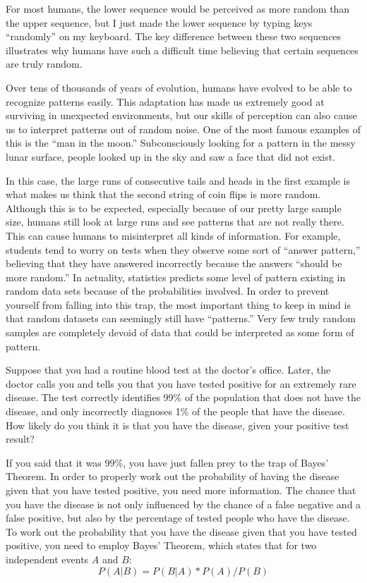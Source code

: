 For most humans, the lower sequence would be perceived as more random than the upper sequence, but I just made the lower sequence by typing keys “randomly” on my keyboard. The key difference between these two sequences illustrates why humans have such a difficult time believing that certain sequences are truly random.

Over tens of thousands of years of evolution, humans have evolved to be able to recognize patterns easily. This adaptation has made us extremely good at surviving in unexpected environments, but our skills of perception can also cause us to interpret patterns out of random noise. One of the most famous examples of this is the “man in the moon.” Subconsciously looking for a pattern in the messy lunar surface, people looked up in the sky and saw a face that did not exist. 

In this case, the large runs of consecutive tails and heads in the first example is what makes us think that the second string of coin flips is more random. Although this is to be expected, especially because of our pretty large sample size, humans still look at large runs and see patterns that are not really there. This can cause humans to misinterpret all kinds of information. For example, students tend to worry on tests when they observe some sort of “answer pattern,” believing that they have answered incorrectly because the answers “should be more random.” In actuality, statistics predicts some level of pattern existing in random data sets because of the probabilities involved. In order to prevent yourself from falling into this trap, the most important thing to keep in mind is that random datasets can seemingly still have “patterns.” Very few truly random samples are completely devoid of data that could be interpreted as some form of pattern.

Suppose that you had a routine blood test at the doctor’s office. Later, the doctor calls you and tells you that you have tested positive for an extremely rare disease. The test correctly identifies 99\% of the population that does not have the disease, and only incorrectly diagnoses 1\% of the people that have the disease. How likely do you think it is that you have the disease, given your positive test result?

If you said that it was 99\%, you have just fallen prey to the trap of Bayes’ Theorem. In order to properly work out the probability of having the disease given that you have tested positive, you need more information. The chance that you have the disease is not only influenced by the chance of a false negative and a false positive, but also by the percentage of tested people who have the disease. To work out the probability that you have the disease given that you have tested positive, you need to employ Bayes’ Theorem, which states that for two independent events \(A\) and \(B\):\@
\[P(A|B) = P(B|A) * P(A) / P(B)\]

